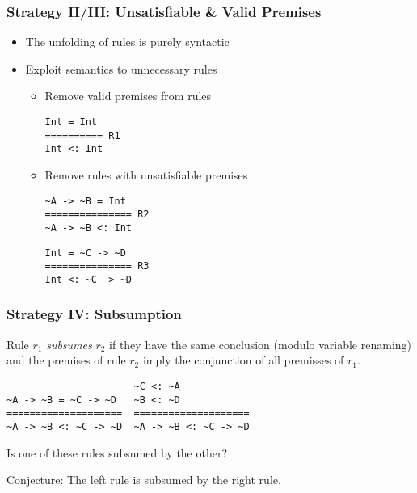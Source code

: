 \documentclass{beamer}
\begin{document}
\begin{frame}[fragile]
  \frametitle{Strategy II/III: Unsatisfiable \& Valid Premises}
  \begin{itemize}
  \item The unfolding of rules is purely syntactic
  \item Exploit semantics to unnecessary rules
    \begin{itemize}
    \item Remove valid premises from rules
      \begin{lstlisting}
Int = Int
========== R1
Int <: Int
      \end{lstlisting}
    \item Remove rules with unsatisfiable premises
      \begin{multicols}{2}
        \begin{lstlisting}
~A -> ~B = Int
=============== R2
~A -> ~B <: Int
        \end{lstlisting}
        \begin{lstlisting}
Int = ~C -> ~D
=============== R3
Int <: ~C -> ~D
        \end{lstlisting}
      \end{multicols}
    \end{itemize}
  \end{itemize}
\end{frame}

\begin{frame}[fragile]
  \frametitle{Strategy IV: Subsumption}
  \begin{definition}
    Rule $r_1$ \emph{subsumes} $r_2$ if they have the same conclusion (modulo
    variable renaming) and the premises of rule $r_2$ imply the
    conjunction of all premisses of $r_1$.
  \end{definition}
  
\begin{lstlisting}
                      ~C <: ~A
~A -> ~B = ~C -> ~D   ~B <: ~D
====================  ====================
~A -> ~B <: ~C -> ~D  ~A -> ~B <: ~C -> ~D
\end{lstlisting}

Is one of these rules subsumed by the other?

Conjecture: The left rule is subsumed by the right rule.
\end{frame}
\end{document}
